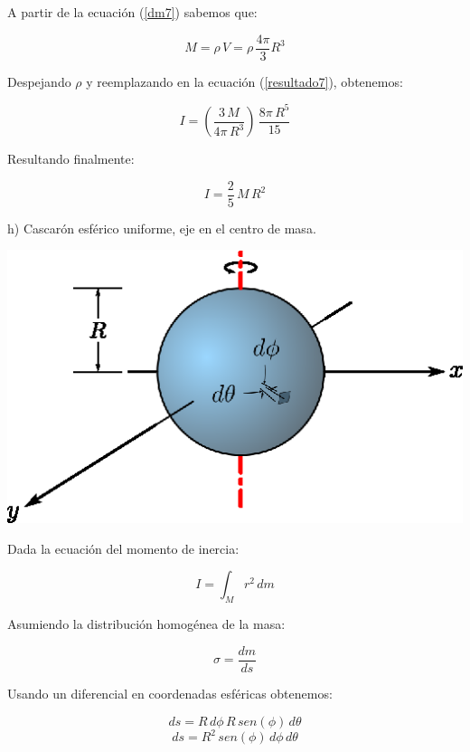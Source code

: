 \documentclass[letter,11pt]{article}
\begin{document}
A partir de la ecuación (\ref{dm7}) sabemos que:

\begin{equation*}
    M = \rho\, V = \rho\, \frac{4\pi}{3} R^3
\end{equation*}

Despejando $\rho$ y reemplazando en la ecuación (\ref{resultado7}), obtenemos:

\begin{equation*}
    I = (\frac{3\, M}{4\pi\, R^3})\, \frac{8\pi\, R^5}{15}
\end{equation*}

Resultando finalmente:

\begin{equation}
    I = \frac{2}{5}\, M\, R^2
\end{equation}

\newpage
h) Cascarón esférico uniforme, eje en el centro de masa.

\begin{center}
\includegraphics[scale=1.75]{resources/f8.eps}
\end{center}

Dada la ecuación del momento de inercia:

\begin{equation}
    I = \int_{M} r^2\, dm
\label{momentodeinercia8}
\end{equation}

Asumiendo la distribución homogénea de la masa:

\begin{equation*}
    \sigma = \frac{dm}{ds}
\end{equation*}

Usando un diferencial en coordenadas esféricas obtenemos:

\begin{equation*}
    ds = R\, d\phi\, R\, sen(\phi)\, d\theta
\end{equation*}
\begin{equation*}
    ds = R^2\, sen (\phi)\, d\phi\, d\theta
\end{equation*}
\end{document}
